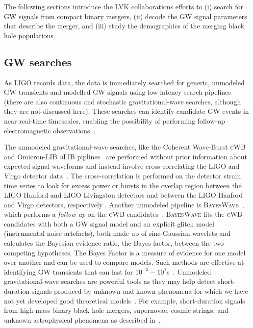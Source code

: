
The following sections introduce the LVK collaborations efforts to (i) search for GW signals from compact binary mergers, (ii) decode the GW signal parameters that describe the merger, and (iii) study the demographics of the merging black hole populations.


\subsection{GW searches}  \label{sec:searches}

As LIGO records data, the data is immediately searched for generic, unmodeled  GW transients and modelled GW signals using low-latency search pipelines (there are also continuous and stochastic gravitational-wave searches, although they are not discussed here). 
These searches can identify candidate GW events in near real-time timescales, enabling the possibility of performing follow-up electromagnetic observations~\cite{abbott2018prospects, gw_search_review}.

The unmodeled gravitational-wave searches, like the Coherent Wave-Burst \textsc{cWB}~\cite{cWB_search} and Omicron-LIB \textsc{oLIB} piplines~\cite{oLIB} are performed without prior information about expected signal waveforms and instead involve cross-correlating the LIGO and Virgo detector data~\cite{gw_search_review}.
The cross-correlation is performed on the detector strain time series to look for excess power or bursts in the overlap region between the LIGO Hanford and LIGO Livingston detectors and between the LIGO Hanford and Virgo detectors, respectively \cite{gw_search_review}. 
Another unmodeled pipeline is \textsc{BayesWave}~\cite{Cornish:2015:CQGra}, which performs a \textit{follow-up} on the \textsc{cWB} candidates~\cite{bayeswave_as_followup, abbott2019all}. 
\textsc{BayesWave} fits the \textsc{cWB} candidates with both a GW signal model and an explicit glitch model (instrumental noise artefacts), both made up of sine-Gaussian wavelets and calculates the Bayesian evidence ratio, the Bayes factor, between the two competing hypotheses. 
The Bayes Factor is a measure of evidence for one model over another and can be used to compare models.
Such methods are effective at identifying GW transients that can last for
$10^{-3}-10^{1}$s~\cite{abbott2016observing}. 
Unmodeled gravitational-wave searches are powerful tools as they may help detect short-duration signals produced by unknown and known phenomena for which we have not yet developed good theoretical models~\cite{gw_search_review}. 
For example, short-duration signals from high mass binary black hole mergers, supernovae, cosmic strings, and unknown astrophysical phenomena as described in~\citep{abbott2018prospects}.

